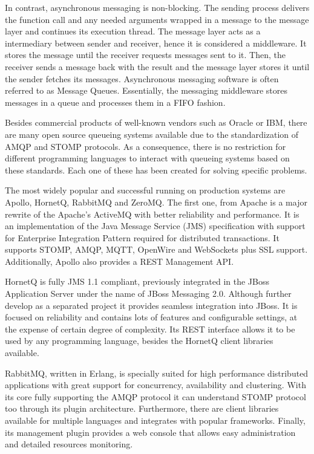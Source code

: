 In contrast, asynchronous messaging is non-blocking. The sending process delivers the function call and any needed arguments wrapped in a message to the message layer and continues its execution thread. The message layer acts as a intermediary between sender and receiver, hence it is considered a middleware. It stores the message until the receiver requests messages sent to it. Then, the receiver sends a message back with the result and the message layer stores it until the sender fetches its messages. Asynchronous messaging software is often referred to as Message Queues. Essentially, the messaging middleware stores messages in a queue and processes them in a FIFO fashion.

Besides commercial products of well-known vendors such as Oracle or IBM, there are many open source queueing systems available \cite{queues} due to the standardization of AMQP and STOMP protocols. As a consequence, there is no restriction for different programming languages to interact with queueing systems based on these standards. Each one of these has been created for solving specific problems.

The most widely popular and successful running on production systems are Apollo, HornetQ, RabbitMQ and ZeroMQ. The first one, from Apache is a major rewrite of the Apache's ActiveMQ with better reliability and performance. It is an implementation of the Java Message Service (JMS) specification with support for Enterprise Integration Pattern required for distributed transactions. It supports STOMP, AMQP, MQTT, OpenWire and WebSockets plus SSL support. Additionally, Apollo also provides a REST Management API.

HornetQ is fully JMS 1.1 compliant, previously integrated in the JBoss Application Server under the name of JBoss Messaging 2.0. Although further develop as a separated project it provides seamless integration into JBoss. It is focused on reliability and contains lots of features and configurable settings, at the expense of certain degree of complexity. Its REST interface allows it to be used by any programming language, besides the HornetQ client libraries available.

RabbitMQ, written in Erlang, is specially suited for high performance distributed applications with great support for concurrency, availability and clustering. With its core fully supporting the AMQP protocol it can understand STOMP protocol too through its plugin architecture. Furthermore, there are client libraries available for multiple languages and integrates with popular frameworks. Finally, its management plugin provides a web console that allows easy administration and detailed resources monitoring.

